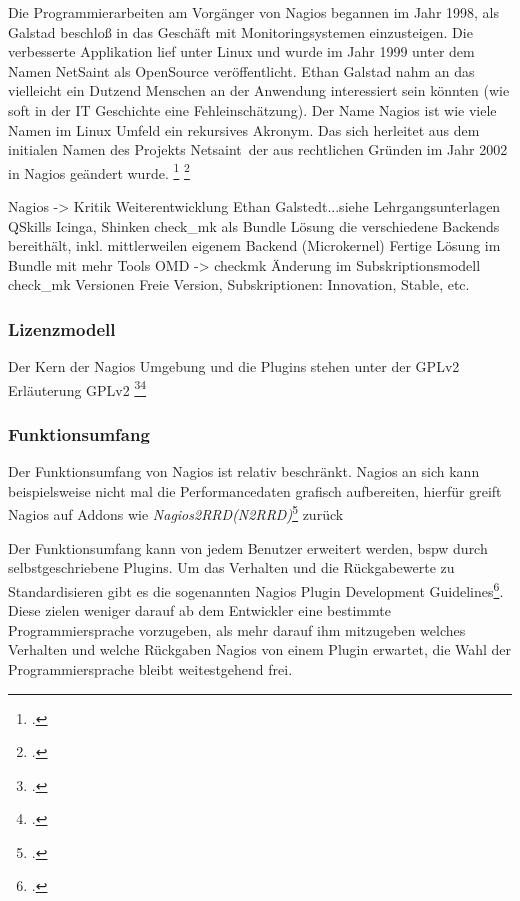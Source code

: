 \documentclass[12pt,a4paper,parskip]{scrreprt}
\begin{document}
	Die Programmierarbeiten am Vorgänger von Nagios begannen im Jahr 1998, als Galstad beschloß in das Geschäft mit Monitoringsystemen einzusteigen. Die verbesserte Applikation lief unter Linux und wurde im Jahr 1999 unter dem Namen NetSaint als OpenSource veröffentlicht. Ethan Galstad nahm an das vielleicht ein Dutzend Menschen an der Anwendung interessiert sein könnten (wie soft in der IT Geschichte eine Fehleinschätzung).
	Der Name Nagios ist wie viele Namen im Linux Umfeld ein rekursives Akronym. Das sich herleitet aus dem initialen Namen des Projekts \glqq Netsaint\grqq\ der aus rechtlichen Gründen im Jahr 2002 in Nagios geändert wurde. 
	\footcite{nagioshistory} \footcite{nagiosnamefaq}
	
	Nagios -> Kritik Weiterentwicklung Ethan Galstedt...siehe Lehrgangsunterlagen QSkills
	Icinga, Shinken
	check\_mk als Bundle Lösung die verschiedene Backends bereithält, inkl. mittlerweilen eigenem Backend (Microkernel)
	Fertige Lösung im Bundle mit mehr Tools
	OMD -> checkmk Änderung im Subskriptionsmodell
	check\_mk Versionen Freie Version, Subskriptionen: Innovation, Stable, etc.
	
	\subsubsection{Lizenzmodell}
	Der Kern der Nagios Umgebung und die Plugins stehen unter der GPLv2
	Erläuterung GPLv2 \footcite{gplv2de}\footcite{gplv2en}
	\subsubsection{Funktionsumfang}
	Der Funktionsumfang von Nagios ist relativ beschränkt. Nagios an sich kann beispielsweise nicht mal die Performancedaten grafisch aufbereiten, hierfür greift
	Nagios auf Addons wie \textit{Nagios2RRD(N2RRD)}\footcite{n2rrdprojecthome} zurück
	
	
	Der Funktionsumfang kann von jedem Benutzer erweitert werden, \acrlong{bspw} durch selbstgeschriebene Plugins. Um das Verhalten und die Rückgabewerte zu Standardisieren gibt es die sogenannten \glqq Nagios Plugin Development Guidelines\grqq\footcite{nagiospluginguidelines}. Diese zielen weniger darauf ab dem Entwickler eine bestimmte Programmiersprache vorzugeben, als mehr darauf ihm mitzugeben welches Verhalten und welche Rückgaben Nagios von einem Plugin erwartet, die Wahl der Programmiersprache bleibt weitestgehend frei.
	
\end{document}

